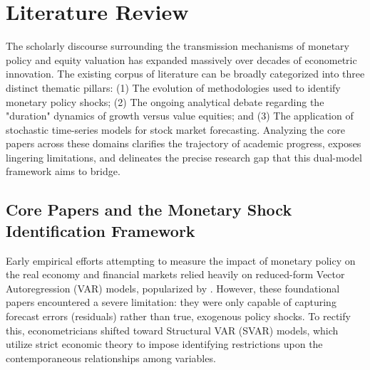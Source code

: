 \documentclass[12pt,a4paper]{report}
\begin{document}
\chapter{Literature Review}

The scholarly discourse surrounding the transmission mechanisms of monetary policy and equity valuation has expanded massively over decades of econometric innovation. The existing corpus of literature can be broadly categorized into three distinct thematic pillars: (1) The evolution of methodologies used to identify monetary policy shocks; (2) The ongoing analytical debate regarding the "duration" dynamics of growth versus value equities; and (3) The application of stochastic time-series models for stock market forecasting. Analyzing the core papers across these domains clarifies the trajectory of academic progress, exposes lingering limitations, and delineates the precise research gap that this dual-model framework aims to bridge.

\section{Core Papers and the Monetary Shock Identification Framework}
Early empirical efforts attempting to measure the impact of monetary policy on the real economy and financial markets relied heavily on reduced-form Vector Autoregression (VAR) models, popularized by \citet{sims1980macroeconomics}. However, these foundational papers encountered a severe limitation: they were only capable of capturing forecast errors (residuals) rather than true, exogenous policy shocks. To rectify this, econometricians shifted toward Structural VAR (SVAR) models, which utilize strict economic theory to impose identifying restrictions upon the contemporaneous relationships among variables.
\end{document}
